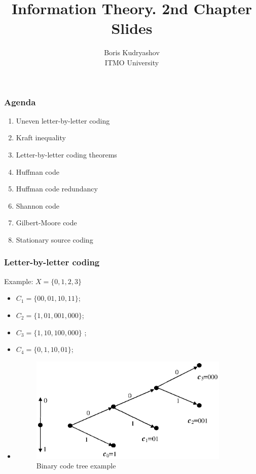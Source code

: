 \documentclass[14pt]{beamer}
\title{\small{Information Theory. 2nd Chapter Slides}}
\author{\huge{
Boris Kudryashov \\
\vspace{30pt}
ITMO University
}}
\begin{document}
\maketitle

\begin{frame}
\frametitle{Agenda}
\begin{enumerate}    
    
    \item Uneven letter-by-letter coding
    \item Kraft inequality
    \item Letter-by-letter coding theorems
    \item Huffman code
    \item Huffman code redundancy
    \item Shannon code
    \item Gilbert-Moore code
    \item Stationary source coding

\end{enumerate}
\end{frame}


\begin{frame}
\frametitle{Letter-by-letter coding}
Example: $X = \{0,1,2,3\}$
\begin{itemize}    

    \item $C_1 = \{00,01,10,11\}$;
    \item $C_2 = \{1,01,001,000\}$;
    \item $C_3 = \{1,10,100,000\}$ ;
    \item $C_4 = \{0,1,10,01\}$;
    
    \item
    \begin{figure}[ht]
    \begin{minipage}{1.0\linewidth}
    \includegraphics[width=0.9\textwidth]{fig2_1.eps}
    \caption{Binary code tree example} \label{code_ex}
    \end{minipage}
    \end{figure}

\end{itemize}
\end{frame}
\end{document}
